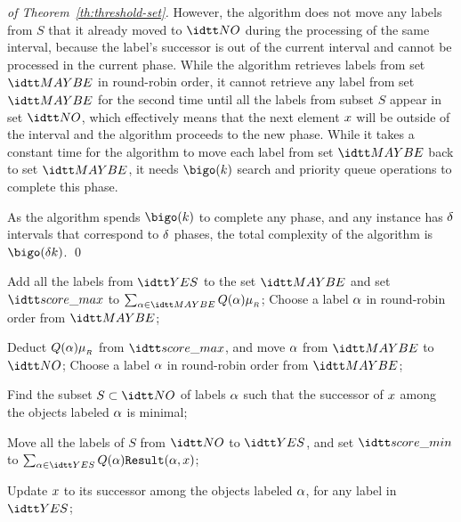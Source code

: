 \begin{PROOF}
\begin{proof}[of Theorem~\ref{th:threshold-set}]
      However, the algorithm does not move any labels from $S$ that it
      already moved to $\setNO$ during the processing of the same
      interval, because the label's successor is out of the current
      interval and cannot be processed in the current phase. While the
      algorithm retrieves labels from set $\setMAYBE$ in round-robin
      order, it cannot retrieve any label from set $\setMAYBE$ for the
      second time until all the labels from subset $S$ appear in set
      $\setNO$, which effectively means that the next element
      $x$ will be outside of the interval and the algorithm
      proceeds to the new phase. While it takes a constant time for
      the algorithm to move each label from set $\setMAYBE$ back to
      set $\setMAYBE$, it needs $\bigo(\nbkeywords)$ search and
      priority queue operations to complete this phase.
  
      As the algorithm spends $\bigo(\nbkeywords)$ to complete any
      phase, and any instance has $\delta$ intervals that
      correspond to $\delta$ phases, the total complexity of the
      algorithm is $\bigo(\difficulty \nbkeywords)$.  \qed
    \end{proof}
  \end{PROOF}
      \begin{algorithm}
        \begin{algorithmic}
          \caption{$(\objectx,\setYES,\setNO,\setMAYBE,\scoremin,\scoremax)$}
          \label{alg:choiceBR}
 
          \STATE Add all the labels from $\setYES$ to the set
          $\setMAYBE$ and set $\scoremax$ to
          $\sum_{\labelx\in\setMAYBE}\Q(\labelx)\maxWeightR$; \STATE
          Choose a label $\alpha$ in round-robin order from
          $\setMAYBE$;

          \STATE Deduct $Q(\alpha)\mu_{_{R}}$ from $\scoremax$, and
          move $\alpha$ from $\setMAYBE$ to $\setNO$; \STATE Choose a
          label $\alpha$ in round-robin order from $\setMAYBE$;
          \ENDWHILE

          \STATE Find the subset $S\subset\setNO$ of labels $\alpha$
          such that the successor of $x$ among the objects
          labeled $\alpha$ is minimal;

          \STATE Move all the labels of $S$ from $\setNO$ to
          $\setYES$, and set $\scoremin$ to
          $\sum_{\labelx\in\setYES}\Q(\labelx)\R(\labelx,\objectx)$;
      
          \STATE Update $x$ to its successor among the objects
          labeled $\alpha$, for any label in $\setYES$;
        \end{algorithmic}
      \end{algorithm}


